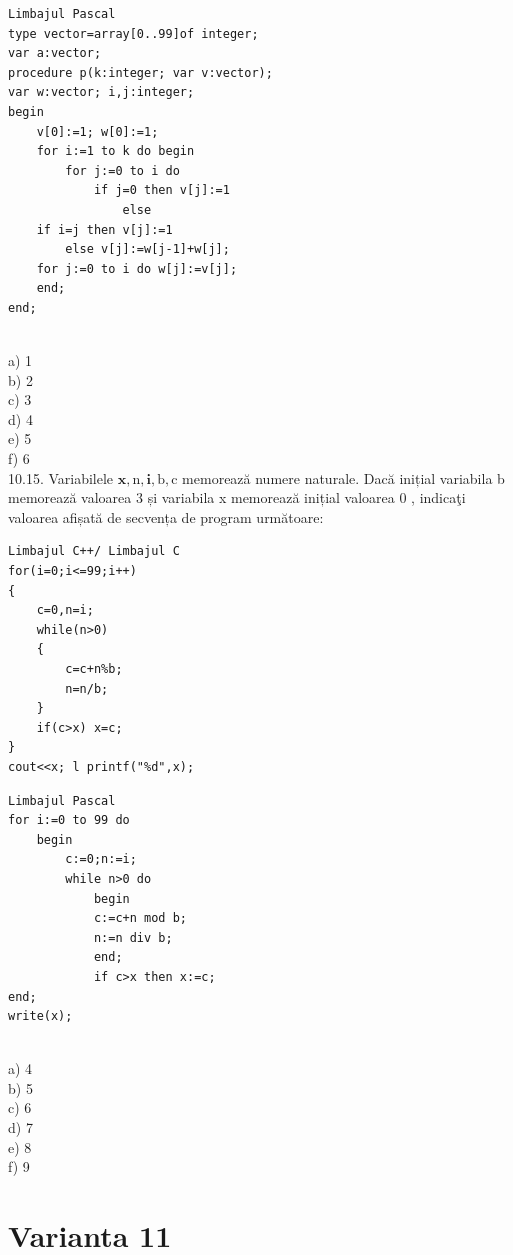 \begin{verbatim}
Limbajul Pascal
type vector=array[0..99]of integer;
var a:vector;
procedure p(k:integer; var v:vector);
var w:vector; i,j:integer;
begin
    v[0]:=1; w[0]:=1;
    for i:=1 to k do begin
        for j:=0 to i do
            if j=0 then v[j]:=1
                else
    if i=j then v[j]:=1
        else v[j]:=w[j-1]+w[j];
    for j:=0 to i do w[j]:=v[j];
    end;
end;
\end{verbatim}
\\
a) 1
\\
b) 2
\\
c) 3
\\
d) 4
\\
e) 5
\\
f) 6
\\
10.15. Variabilele $\mathbf{x}, \mathrm{n}, \mathbf{i}, \mathrm{b}, \mathrm{c}$ memorează numere naturale. Dacă inițial variabila b memorează valoarea 3 și variabila x memorează inițial valoarea 0 , indicaţi valoarea afișată de secvența de program următoare:
\begin{verbatim}
Limbajul C++/ Limbajul C
for(i=0;i<=99;i++)
{
    c=0,n=i;
    while(n>0)
    {
        c=c+n%b;
        n=n/b;
    }
    if(c>x) x=c;
}
cout<<x; l printf("%d",x);
\end{verbatim}
\begin{verbatim}
Limbajul Pascal
for i:=0 to 99 do
    begin
        c:=0;n:=i;
        while n>0 do
            begin
            c:=c+n mod b;
            n:=n div b;
            end;
            if c>x then x:=c;
end;
write(x);
\end{verbatim}\
\\
a) 4
\\
b) 5
\\
c) 6
\\
d) 7
\\
e) 8
\\
f) 9
\\


\section*{Varianta 11}

